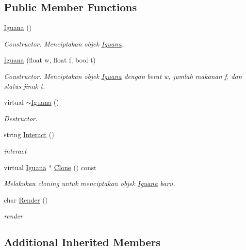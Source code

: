 \subsection*{Public Member Functions}
\begin{DoxyCompactItemize}
\item 
\hyperlink{classIguana_aadc10a5bb8364d915bfd1d3d8ab3156a}{Iguana} ()
\begin{DoxyCompactList}\small\item\em Constructor. Menciptakan objek \hyperlink{classIguana}{Iguana}. \end{DoxyCompactList}\item 
\hyperlink{classIguana_ae03d713eaadf2182168ce23f25ed36f8}{Iguana} (float w, float f, bool t)
\begin{DoxyCompactList}\small\item\em Constructor. Menciptakan objek \hyperlink{classIguana}{Iguana} dengan berat w, jumlah makanan f, dan status jinak t. \end{DoxyCompactList}\item 
virtual \hyperlink{classIguana_af0a4082cc22aea6f76f42c859d9375ad}{$\sim$\+Iguana} ()
\begin{DoxyCompactList}\small\item\em Destructor. \end{DoxyCompactList}\item 
string \hyperlink{classIguana_a271ef320fd3d4973e50e89aa30cffe3e}{Interact} ()
\begin{DoxyCompactList}\small\item\em interact \end{DoxyCompactList}\item 
virtual \hyperlink{classIguana}{Iguana} $\ast$ \hyperlink{classIguana_a40e56fb855d09d2a8788dc73e2fdfc8a}{Clone} () const 
\begin{DoxyCompactList}\small\item\em Melakukan cloning untuk menciptakan objek \hyperlink{classIguana}{Iguana} baru. \end{DoxyCompactList}\item 
char \hyperlink{classIguana_a18bbb71a80e6b2a9855623b1c7f108b9}{Render} ()
\begin{DoxyCompactList}\small\item\em render \end{DoxyCompactList}\end{DoxyCompactItemize}
\subsection*{Additional Inherited Members}


